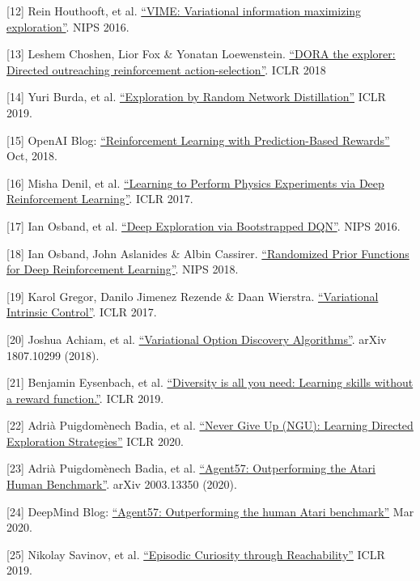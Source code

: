 {[}12{]} Rein Houthooft, et al. \href{https://arxiv.org/abs/1605.09674}{``VIME: Variational information maximizing exploration''}. NIPS 2016.

{[}13{]} Leshem Choshen, Lior Fox \& Yonatan Loewenstein. \href{https://arxiv.org/abs/1804.04012}{``DORA the explorer: Directed outreaching reinforcement action-selection''}. ICLR 2018

{[}14{]} Yuri Burda, et al. \href{https://arxiv.org/abs/1810.12894}{``Exploration by Random Network Distillation''} ICLR 2019.

{[}15{]} OpenAI Blog: \href{https://openai.com/blog/reinforcement-learning-with-prediction-based-rewards/}{``Reinforcement Learning with Prediction-Based Rewards''} Oct, 2018.

{[}16{]} Misha Denil, et al. \href{https://arxiv.org/abs/1611.01843}{``Learning to Perform Physics Experiments via Deep Reinforcement Learning''}. ICLR 2017.

{[}17{]} Ian Osband, et al. \href{https://arxiv.org/abs/1602.04621}{``Deep Exploration via Bootstrapped DQN''}. NIPS 2016.

{[}18{]} Ian Osband, John Aslanides \& Albin Cassirer. \href{https://arxiv.org/abs/1806.03335}{``Randomized Prior Functions for Deep Reinforcement Learning''}. NIPS 2018.

{[}19{]} Karol Gregor, Danilo Jimenez Rezende \& Daan Wierstra. \href{https://arxiv.org/abs/1611.07507}{``Variational Intrinsic Control''}. ICLR 2017.

{[}20{]} Joshua Achiam, et al. \href{https://arxiv.org/abs/1807.10299}{``Variational Option Discovery Algorithms''}. arXiv 1807.10299 (2018).

{[}21{]} Benjamin Eysenbach, et al. \href{https://arxiv.org/abs/1802.06070}{``Diversity is all you need: Learning skills without a reward function.''}. ICLR 2019.

{[}22{]} Adrià Puigdomènech Badia, et al. \href{https://arxiv.org/abs/2002.06038}{``Never Give Up (NGU): Learning Directed Exploration Strategies''} ICLR 2020.

{[}23{]} Adrià Puigdomènech Badia, et al. \href{https://arxiv.org/abs/2003.13350}{``Agent57: Outperforming the Atari Human Benchmark''}. arXiv 2003.13350 (2020).

{[}24{]} DeepMind Blog: \href{https://deepmind.com/blog/article/Agent57-Outperforming-the-human-Atari-benchmark}{``Agent57: Outperforming the human Atari benchmark''} Mar 2020.

{[}25{]} Nikolay Savinov, et al. \href{https://arxiv.org/abs/1810.02274}{``Episodic Curiosity through Reachability''} ICLR 2019.

